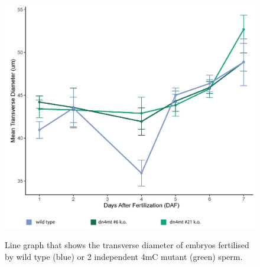 \begin{figure}[htbp!] 
\centering    
    \includegraphics[width=1\textwidth]{Chapter3/Figs/Supps/FigureS4_transverse_diameter.pdf}
\caption{Line graph that shows the transverse diameter of embryos fertilised by wild type (blue) or 2 independent 4mC mutant (green) sperm.}
\label{fig:transverse_diameter}
\captionsetup{font=small}
    \caption*{}
\end{figure}


